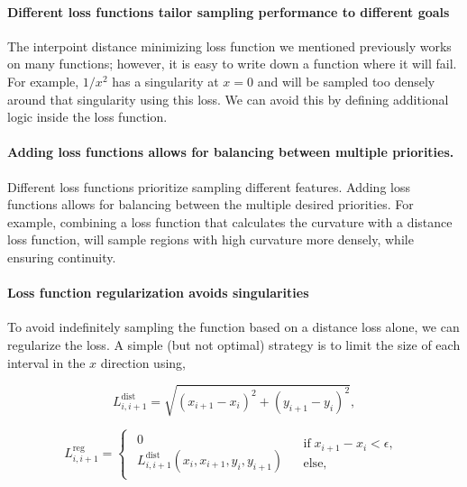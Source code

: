 \documentclass[english, twocolumn, 10pt, aps, superscriptaddress, floatfix, prb, citeautoscript]{revtex4-1}
\begin{document}
\paragraph{Different loss functions tailor sampling performance to different goals}

The interpoint distance minimizing loss function we mentioned previously works on many functions; however, it is easy to write down a function where it will fail.
For example, \(1/x^2\) has a singularity at \(x=0\) and will be sampled too densely around that singularity using this loss.
We can avoid this by defining additional logic inside the loss function.

\paragraph{Adding loss functions allows for balancing between multiple priorities.}

Different loss functions prioritize sampling different features.
Adding loss functions allows for balancing between the multiple desired priorities.
For example, combining a loss function that calculates the curvature with a distance loss function, will sample regions with high curvature more densely, while ensuring continuity.

\paragraph{Loss function regularization avoids singularities}

To avoid indefinitely sampling the function based on a distance loss alone, we can regularize the loss.
A simple (but not optimal) strategy is to limit the size of each interval in the \(x\) direction using,

\begin{equation*}
L_{i, i+1}^\textrm{dist}=\sqrt{(x_{i+1}-x_{i})^{2}+(y_{i+1}-y_{i})^{2}},
\end{equation*}

\begin{equation*}
L_{i,i+1}^\textrm{reg}=\begin{cases}
\begin{array}{c}
0\\
L_{i, i+1}^\textrm{dist}(x_i, x_{i+1}, y_i, y_{i+1})
\end{array} & \begin{array}{c}
\textrm{if} \; x_{i+1}-x_{i}<\epsilon,\\
\textrm{else,}
\end{array}\end{cases}
\end{equation*}
\end{document}
